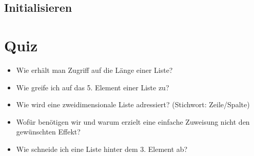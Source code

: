 \subsection{Initialisieren}
\begin{frame}
    \slidehead
    \vskip -12pt
\end{frame}

\livecoding

\section{Quiz}
\begin{frame}
    \slidehead
    \begin{itemize}
        \item Wie erhält man Zugriff auf die Länge einer Liste?
            \pause
        \item Wie greife ich auf das 5. Element einer Liste zu?
            \pause
        \item Wie wird eine zweidimensionale Liste adressiert? (Stichwort: Zeile/Spalte)
            \pause
        \item Wofür benötigen wir  und warum erzielt eine einfache Zuweisung nicht den gewünschten Effekt?
            \pause
        \item Wie schneide ich eine Liste hinter dem 3. Element ab?
    \end{itemize}
\end{frame}



